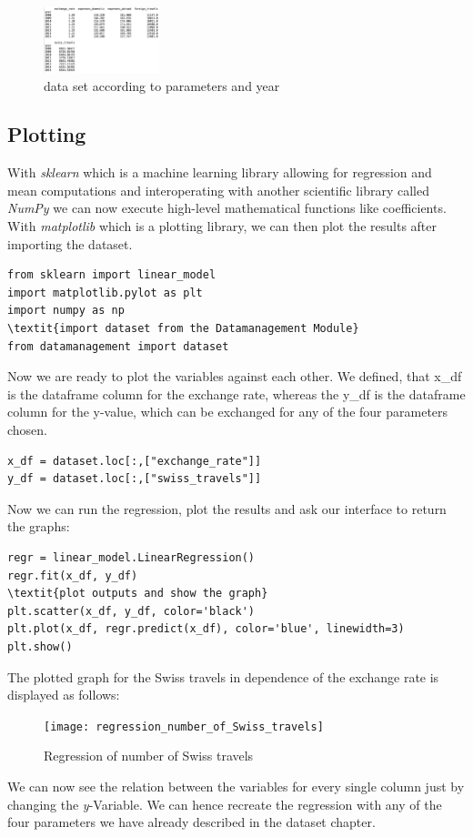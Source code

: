 \documentclass[12pt,a4paper,bibliography=totocnumbered,listof=totocnumbered]{scrartcl}
\begin{document}
\begin{figure}[htbp] 
  \centering
     \includegraphics[width=0.3\textwidth]{data_table}
  \caption{data set according to parameters and year }
  \label{fig: figure2}
\end{figure}


\subsection{Plotting}
With \textit{sklearn} which is a machine learning library allowing for regression and mean computations and interoperating with another scientific library called \textit{NumPy} we can now execute high-level mathematical functions like coefficients. With \textit{matplotlib} which is a plotting library, we can then plot the results after importing the dataset. 

\begin{verbatim}
from sklearn import linear_model
import matplotlib.pylot as plt
import numpy as np
\textit{import dataset from the Datamanagement Module}
from datamanagement import dataset
\end{verbatim}

Now we are ready to plot the variables against each other. We defined, that x_df is the dataframe column for the exchange rate, whereas the y_df is the dataframe column for the y-value, which can be exchanged for any of the four parameters chosen. 
\begin{verbatim}
x_df = dataset.loc[:,["exchange_rate"]]
y_df = dataset.loc[:,["swiss_travels"]]
\end{verbatim}


Now we can run the regression, plot the results and ask our interface to return the graphs:
\begin{verbatim}
regr = linear_model.LinearRegression()
regr.fit(x_df, y_df)
\textit{plot outputs and show the graph}
plt.scatter(x_df, y_df, color='black')
plt.plot(x_df, regr.predict(x_df), color='blue', linewidth=3)
plt.show()
\end{verbatim}

The plotted graph for the Swiss travels in dependence of the exchange rate is displayed as follows: 
\begin{figure}[htbp] 
  \centering
     \texttt{[image: regression\_number\_of\_Swiss\_travels]}
  \caption{Regression of number of Swiss travels}
  \label{fig: figure3}
\end{figure}
We can now see the relation between the variables for every single column just by changing the \textit{y}-Variable. We can hence recreate the regression with any of the four parameters we have already described in the dataset chapter. 
\end{document}
